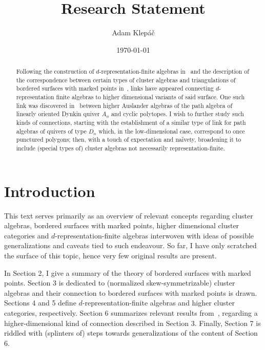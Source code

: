 \documentclass[a4paper,oneside,svgnames]{amsart}
\title{Research Statement}
\author{Adam Klepáč}
\date{\today}
\begin{document}
 \maketitle
 \begin{abstract}
  Following the construction of $d$-representation-finite algebras
  in~\cite{iyama} and the description of the correspondence between certain
  types of cluster algebras and triangulations of bordered surfaces with marked
  points in~\cite{fst}, links have appeared connecting $d$-representation finite
  algebras to higher dimensional variants of said surface. One such link was
  discovered in~\cite{ot} between higher Auslander algebras of the path algebra
  of linearly oriented Dynkin quiver $A_n$ and cyclic polytopes. I wish to
  further study such kinds of connections, starting with the establishment of a
  similar type of link for path algebras of quivers of type $D_n$ which, in the
  low-dimensional case, correspond to once punctured polygons; then, with a
  touch of expectation and naïvety, broadening it to include (special types of)
  cluster algebras not necessarily representation-finite.
 \end{abstract}

 \section{Introduction}
 \label{sec:introduction}

 This text serves primarily as an overview of relevant concepts regarding
 cluster algebras, bordered surfaces with marked points, higher dimensional
 cluster categories and $d$-representation-finite algebras interwoven with ideas
 of possible generalizations and caveats tied to such endeavour. So far, I have
 only scratched the surface of this topic, hence very few original results are
 present.

 In Section 2, I give a summary of the theory of bordered surfaces with marked
 points. Section 3 is dedicated to (normalized skew-symmetrizable) cluster
 algebras and their connection to bordered surfaces with marked points is drawn.
 Sections 4 and 5 define $d$-representation-finite algebras and higher cluster
 categories, respectively. Section 6 summarizes relevant results
 from~\cite{ot}, regarding a higher-dimensional kind of connection described in
 Section 3. Finally, Section 7 is riddled with (splinters of) steps towards
 generalizations of the content of Section 6.

 
\end{document}
